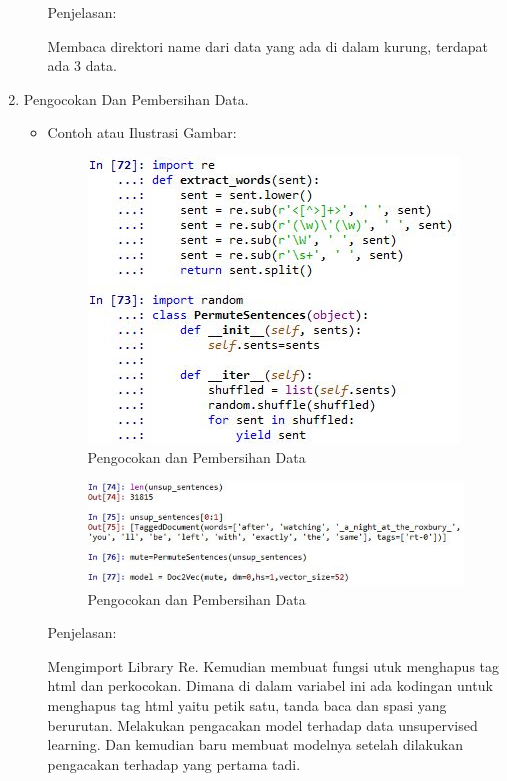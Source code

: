 \begin{enumerate}
\begin{itemize}
Penjelasan:

Membaca direktori name dari data yang ada di dalam kurung, terdapat ada 3 data.

\end{itemize}

\item Pengocokan Dan Pembersihan Data.
\begin{itemize}
\item Contoh atau Ilustrasi Gambar: 

\begin{figure}[H]
\centering
\includegraphics[scale=0.7]{figures/1174051/5/60.jpg}
\caption{Pengocokan dan Pembersihan Data}
\label{Pengocokan dan Pembersihan Data}
\end{figure}

\begin{figure}[H]
\centering
\includegraphics[scale=0.7]{figures/1174051/5/61.jpg}
\caption{Pengocokan dan Pembersihan Data}
\label{Pengocokan dan Pembersihan Data}
\end{figure}

Penjelasan:

Mengimport Library Re. Kemudian membuat fungsi utuk menghapus tag html dan perkocokan. Dimana di dalam variabel ini ada kodingan untuk menghapus tag html yaitu petik satu, tanda baca dan spasi yang berurutan. Melakukan pengacakan model terhadap data unsupervised learning. Dan kemudian baru membuat modelnya setelah dilakukan pengacakan terhadap yang pertama tadi.


\end{itemize}
\end{enumerate}

